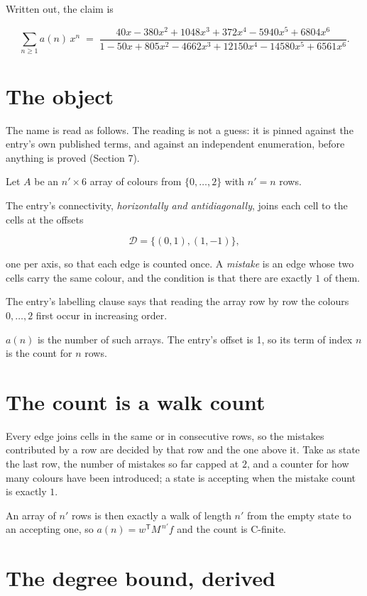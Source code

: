 \documentclass[11pt]{article}
\theoremstyle{definition}
\begin{document}
Written out, the claim is

\[\sum_{n \ge 1} a(n)\,x^n \;=\; \frac{40x - 380x^{2} + 1048x^{3} + 372x^{4} - 5940x^{5} + 6804x^{6}}{1 - 50x + 805x^{2} - 4662x^{3} + 12150x^{4} - 14580x^{5} + 6561x^{6}}.\]

\section{The object}

The name is read as follows. The reading is not a guess: it is pinned against the entry's own published terms, and against an independent enumeration, before anything is proved (Section 7).

Let $A$ be an $n' \times 6$ array of colours from $\{0,\dots,2\}$ with $n' = n$ rows.

The entry's connectivity, {\itshape horizontally and antidiagonally}, joins each cell to the cells at the offsets

\[\mathcal{D} = \{(0,1), (1,-1)\},\]

one per axis, so that each edge is counted once. A {\itshape mistake} is an edge whose two cells carry the same colour, and the condition is that there are exactly $1$ of them.

The entry's labelling clause says that reading the array row by row the colours $0,\dots,2$ first occur in increasing order.

$a(n)$ is the number of such arrays. The entry's offset is 1, so its term of index $n$ is the count for $n$ rows.

\section{The count is a walk count}

Every edge joins cells in the same or in consecutive rows, so the mistakes contributed by a row are decided by that row and the one above it. Take as state the last row, the number of mistakes so far capped at $2$, and a counter for how many colours have been introduced; a state is accepting when the mistake count is exactly $1$.

An array of $n'$ rows is then exactly a walk of length $n'$ from the empty state to an accepting one, so $a(n) = w^{\mathsf T}M^{\,n'}f$ and the count is C-finite.

\section{The degree bound, derived}
\end{document}
